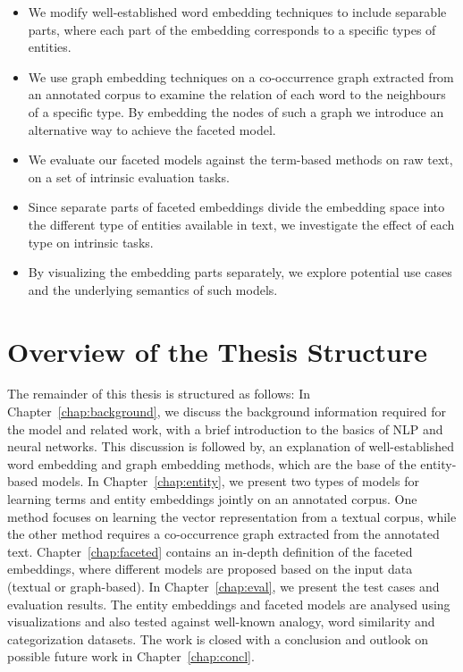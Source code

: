 \begin{itemize}
\item We modify well-established word embedding techniques to include separable parts, where each part of the embedding corresponds to a specific types of entities. 
\item We use graph embedding techniques on a co-occurrence graph extracted from an annotated corpus to examine the relation of each word to the neighbours of a specific type. By embedding the nodes of such a graph we introduce an alternative way to achieve the faceted model.
\item We evaluate our faceted models against the term-based methods on raw text, on a set of intrinsic evaluation tasks. 
\item Since separate parts of faceted embeddings divide the embedding space into the different type of entities available in text, we investigate the effect of each type on intrinsic tasks. 
\item By visualizing the embedding parts separately, we explore potential use cases and the underlying semantics of such models.   
\end{itemize}



\section{Overview of the Thesis Structure}
The remainder of this thesis is structured as follows: 
In Chapter~\ref{chap:background},  we discuss the background information required for the model and related work, with a brief introduction to the basics of NLP and neural networks. This discussion is followed by, an explanation of well-established word embedding and graph embedding methods, which are the base of the entity-based models. In Chapter~\ref{chap:entity}, we present two types of models for learning terms and entity embeddings jointly on an annotated corpus. One method focuses on learning the vector representation from a textual corpus, while the other method requires a co-occurrence graph extracted from the annotated text.
Chapter~\ref{chap:faceted} contains an in-depth definition of the faceted embeddings, where different models are proposed based on the input data (textual or graph-based). 
In Chapter~\ref{chap:eval}, we present the test cases and evaluation results. The entity embeddings and faceted models are analysed using visualizations and also tested against well-known analogy, word similarity and categorization datasets. The work is closed with a conclusion and outlook on possible future work in Chapter~\ref{chap:concl}. 


